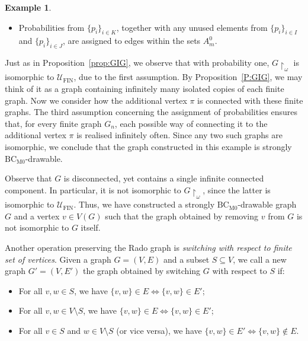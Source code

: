 \documentclass{amsart}
\theoremstyle{plain}
\theoremstyle{definition}
\newtheorem{exa}[theorem]{Example}
\theoremstyle{remark}
\numberwithin{equation}{section}
\newcommand{\on}{\operatorname}
\newcommand{\UU}{\mathcal{U}}
\DeclareMathOperator{\fin}{FIN}
\begin{document}
\begin{exa}
\begin{itemize}
    

\[
    = \sum_{m\in C_n^k} \mu_{\mathbf{p}}\left( G\upharpoonright A_n^m = G_n^m \right) \cdot \mu_{\mathbf{p}}\left( G\upharpoonright A_n^m \text{ is connected to } \pi \text{ according to } w_k \text{ and } \phi_n^m \right) = \infty;
    \]


    
    \item Probabilities from \(\{p_i\}_{i\in K}\), together with any unused elements from \(\{p_i\}_{i\in I}\) and \(\{p_i\}_{i\in J}\), are assigned to edges within the sets \(A^0_m\).
\end{itemize}
        
Just as in Proposition~\ref{prop:GIG}, we observe that with probability one,  \(G\upharpoonright_\omega\) is isomorphic to \(\UU_{\fin}\), due to the first assumption. By Proposition~\ref{P:GIG}, we may think of it as a graph containing infinitely many isolated copies of each finite graph. Now we consider how the additional vertex \(\pi\) is connected with these finite graphs. The third assumption concerning the assignment of probabilities ensures that, for every finite graph \(G_n\), each possible way of connecting it to the additional vertex $\pi$ is realised infinitely often. Since any two such graphs are isomorphic, we conclude that the graph constructed in this example is strongly $\on{BC_{M0}}$-drawable.

Observe that \(G\) is disconnected, yet contains a single infinite connected component. In particular, it is not isomorphic to \(G\upharpoonright_\omega\), since the latter is isomorphic to \(\UU_{\fin}\). Thus, we have constructed a strongly $\on{BC_{M0}}$-drawable graph \(G\) and a vertex \(v\in V(G)\) such that the graph obtained by removing \(v\) from \(G\) is not isomorphic to \(G\) itself.

\end{exa} 

Another operation preserving the Rado graph is \textit{switching with respect to finite set of vertices}. Given a graph \(G = (V, E)\) and a subset \(S \subseteq V\),  we  call a new graph $G'=(V,E')$ the graph obtained by switching $G$ with respect to $S$ if:
\begin{itemize}
    \item For all \(v, w \in S\), we have \(\{v, w\} \in E \iff \{v, w\} \in E'\);
    \item For all \(v, w \in V \setminus S\), we have \(\{v, w\} \in E \iff \{v, w\} \in E'\);
    \item For all \(v \in S\) and \(w \in V \setminus S\) (or vice versa), we have \(\{v, w\} \in E' \iff \{v, w\} \notin E\).
\end{itemize}
\end{document}
